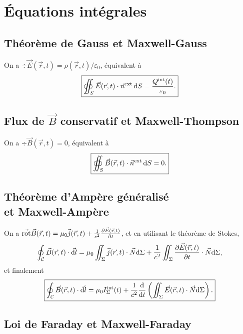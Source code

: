 \section{Équations intégrales}
\subsection{Théorème de Gauss et Maxwell-Gauss}

On a $\div\vec{E}(\vec{r},t)=\rho(\vec{r},t)/\varepsilon_0$, équivalent à 
\begin{equation}
    \boxed{
        \oiint_{S}\vec{E}(\vec{r},t)\cdot\vec{n}^{\mathrm{ext}}\,\mathrm{d} S=\frac{Q^{\mathrm{int}}(t)}{\varepsilon_0}.
    }
\end{equation}

\subsection{Flux de \texorpdfstring{$\vec{B}$}{B} conservatif et Maxwell-Thompson}

On a $\div\vec{B}(\vec{r},t)=0$, équivalent à
\begin{equation}
    \boxed{
        \oiint_{S}\vec{B}(\vec{r},t)\cdot\vec{n}^{\mathrm{ext}}\,\mathrm{d} S=0.
    }
\end{equation}

\subsection{Théorème d'Ampère généralisé\texorpdfstring{\\}{ }et Maxwell-Ampère}

On a $\vec{\mathrm{rot}}\vec{B}(\vec{r},t)=\mu_0\vec{j}(\vec{r},t)+\frac{1}{c^{2}}\frac{\partial\vec{E}(\vec{r},t)}{\partial t}$, et en utilisant le théorème de Stokes,
\begin{equation}
    \oint_{\mathcal{C}}\vec{B}(\vec{r},t)\cdot\vec{\mathrm{d} l}=\mu_0\iint_{\Sigma}\vec{j}(\vec{r},t)\cdot\vec{N}\mathrm{d}\Sigma+\frac{1}{c^{2}}\iint_{\Sigma}\frac{\partial\vec{E}(\vec{r},t)}{\partial t}\cdot\vec{N}\mathrm{d}\Sigma,
\end{equation}
et finalement
\begin{equation}
    \boxed{
        \oint_{\mathcal{C}}\vec{B}(\vec{r},t)\cdot\vec{\mathrm{d} l}=\mu_{0}I_{\Sigma}^{\mathrm{int}}(t)+\frac{1}{c^{2}}\frac{\mathrm{d}}{\mathrm{d} t}\left(\iint_{\Sigma}\vec{E}(\vec{r},t)\cdot\vec{N}\mathrm{d}\Sigma\right).
    }
\end{equation}

\subsection{Loi de Faraday et Maxwell-Faraday}

